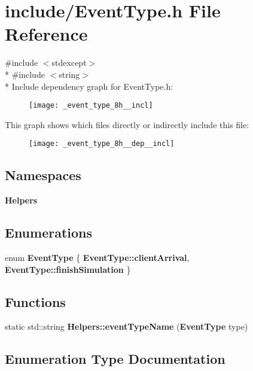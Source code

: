 \section{include/\+Event\+Type.h File Reference}
\label{_event_type_8h}
{\ttfamily \#include $<$stdexcept$>$}\\*
{\ttfamily \#include $<$string$>$}\\*
Include dependency graph for Event\+Type.\+h\+:
\nopagebreak
\begin{figure}[H]
\begin{center}
\leavevmode
\texttt{[image: \_event\_type\_8h\_\_incl]}
\end{center}
\end{figure}
This graph shows which files directly or indirectly include this file\+:
\nopagebreak
\begin{figure}[H]
\begin{center}
\leavevmode
\texttt{[image: \_event\_type\_8h\_\_dep\_\_incl]}
\end{center}
\end{figure}
\subsection*{Namespaces}
\begin{DoxyCompactItemize}
\item 
 {\bf Helpers}
\end{DoxyCompactItemize}
\subsection*{Enumerations}
\begin{DoxyCompactItemize}
\item 
enum {\bf Event\+Type} \{ {\bf Event\+Type\+::client\+Arrival}, 
{\bf Event\+Type\+::finish\+Simulation}
 \}
\end{DoxyCompactItemize}
\subsection*{Functions}
\begin{DoxyCompactItemize}
\item 
static std\+::string {\bf Helpers\+::event\+Type\+Name} ({\bf Event\+Type} type)
\end{DoxyCompactItemize}


\subsection{Enumeration Type Documentation}
